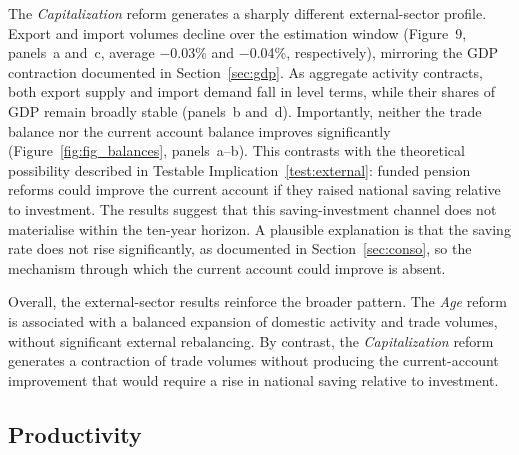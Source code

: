 \documentclass[11pt,english,a4paper, twoside, authoryear]{article}
\begin{document}
The \textit{Capitalization} reform generates a sharply different external-sector profile. Export and import volumes decline over the estimation window (Figure~9, panels~a and~c, average $-$0.03\% and $-$0.04\%, respectively), mirroring the GDP contraction documented in Section~\ref{sec:gdp}. As aggregate activity contracts, both export supply and import demand fall in level terms, while their shares of GDP remain broadly stable (panels~b and~d). Importantly, neither the trade balance nor the current account balance improves significantly (Figure~\ref{fig:fig_balances}, panels~a--b). This contrasts with the theoretical possibility described in Testable Implication~\ref{test:external}: funded pension reforms could improve the current account if they raised national saving relative to investment. The results suggest that this saving-investment channel does not materialise within the ten-year horizon. A plausible explanation is that the saving rate does not rise significantly, as documented in Section~\ref{sec:conso}, so the mechanism through which the current account could improve is absent.

Overall, the external-sector results reinforce the broader pattern. The \textit{Age} reform is associated with a balanced expansion of domestic activity and trade volumes, without significant external rebalancing. By contrast, the \textit{Capitalization} reform generates a contraction of trade volumes without producing the current-account improvement that would require a rise in national saving relative to investment.

\FloatBarrier
\subsection{Productivity}\label{sec:prod}
\label{sec:prod}
\end{document}
